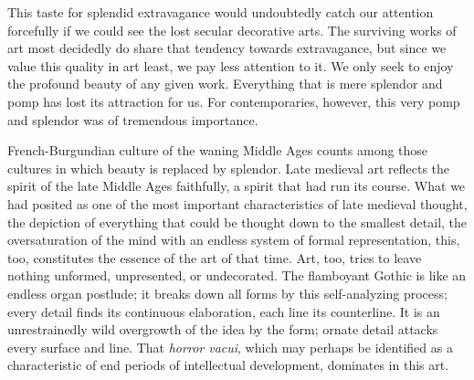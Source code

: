 This taste for splendid extravagance would undoubtedly catch our
attention forcefully if we could see the lost secular decorative arts.
The surviving works of art most decidedly do share that tendency towards
extravagance, but since we value this quality in art least, we pay less
attention to it. We only seek to enjoy the profound beauty of any given
work. Everything that is mere splendor and pomp has lost its attraction
for us. For contemporaries, however, this very pomp and splendor was of
tremendous importance.

French-Burgundian culture of the waning Middle Ages counts among those
cultures in which beauty is replaced by splendor. Late medieval art
reflects the spirit of the late Middle Ages faithfully, a spirit that
had run its course. What we had posited as one of the most important
characteristics of late medieval thought, the depiction of everything
that could be thought down to the smallest detail, the oversaturation of
the mind with an endless system of formal representation, this, too,
constitutes the essence of the art of that time. Art, too, tries to
leave nothing unformed, unpresented, or undecorated. The flamboyant
Gothic is like an endless organ postlude; it breaks down all forms by
this self-analyzing
\protect\hypertarget{20_ILLUSTRATIONS_FOLLOW_PAGE.xhtmlux5cux23page_301}{}{}process;
every detail finds its continuous elaboration, each line its
counterline. It is an unrestrainedly wild overgrowth of the idea by the
form; ornate detail attacks every surface and line. That \emph{horror
vacui}, which may perhaps be identified as a characteristic of end
periods of intellectual development, dominates in this art.

